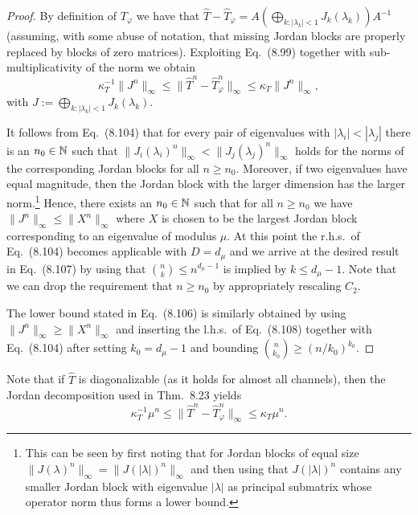 \documentclass[11pt,a4paper]{article}
\theoremstyle{plain}
\theoremstyle{definition}
\theoremstyle{remark}
\begin{document}
\begin{proof}
    By definition of $T_\varphi$ we have that $\hat{T}-\hat{T}_\varphi=A(\bigoplus_{k:|\lambda_k|<1} J_k(\lambda_k))A^{-1}$
    (assuming, with some abuse of notation, that missing Jordan blocks are properly replaced by blocks of zero matrices).
    Exploiting Eq.~(8.99) together with sub-multiplicativity of the norm we obtain
    \begin{equation}\tag{8.108}
        \kappa_T^{-1}\|J^n\|_\infty \le \|\hat{T}^n-\hat{T}_\varphi^n\|_\infty \le \kappa_T\|J^n\|_\infty,
    \end{equation}
    with $J:=\bigoplus_{k:|\lambda_k|<1} J_k(\lambda_k)$.

    It follows from Eq.~(8.104) that for every pair of eigenvalues with $|\lambda_i|<|\lambda_j|$ there is an $n_0\in\mathbb{N}$ such that
    $\|J_i(\lambda_i)^n\|_\infty < \|J_j(\lambda_j)^n\|_\infty$ holds for the norms of the corresponding Jordan blocks for all $n\ge n_0$.
    Moreover, if two eigenvalues have equal magnitude, then the Jordan block with the larger dimension has the larger norm.\footnote{This can be seen by first noting that for Jordan blocks of equal size
        $\|J(\lambda)^n\|_\infty=\|J(|\lambda|)^n\|_\infty$ and then using that $J(|\lambda|)^n$ contains any smaller Jordan block with eigenvalue $|\lambda|$ as principal submatrix
        whose operator norm thus forms a lower bound.}
    Hence, there exists an $n_0\in\mathbb{N}$ such that for all $n\ge n_0$ we have $\|J^n\|_\infty \le \|X^n\|_\infty$ where $X$ is chosen to be the largest Jordan block
    corresponding to an eigenvalue of modulus $\mu$. At this point the r.h.s.\ of Eq.~(8.104) becomes applicable with $D=d_\mu$ and we arrive at the desired result in Eq.~(8.107)
    by using that $\binom{n}{k}\le n^{d_\mu-1}$ is implied by $k\le d_\mu-1$. Note that we can drop the requirement that $n\ge n_0$ by appropriately rescaling $C_2$.

    The lower bound stated in Eq.~(8.106) is similarly obtained by using $\|J^n\|_\infty\ge \|X^n\|_\infty$ and inserting the l.h.s.\ of Eq.~(8.108) together with Eq.~(8.104)
    after setting $k_0=d_\mu-1$ and bounding $\binom{n}{k_0}\ge (n/k_0)^{k_0}$.
\end{proof}

Note that if $\hat{T}$ is diagonalizable (as it holds for almost all channels), then the Jordan decomposition used in Thm.~8.23 yields
\begin{equation}\tag{8.109}
    \kappa_T^{-1}\mu^n \le \|\hat{T}^n-\hat{T}_\varphi^n\|_\infty \le \kappa_T\mu^n.
\end{equation}
\end{document}
